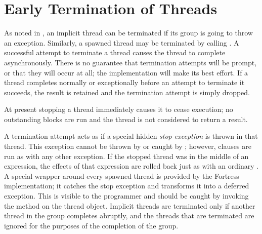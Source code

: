 %
%
%
%

\section{Early Termination of Threads}

As noted in , an implicit thread
can be terminated if its group is going to throw an exception.
Similarly, a spawned thread  may be terminated by calling
.  A successful attempt to terminate a thread causes the
thread to complete asynchronously.  There is no guarantee that
termination attempts will be prompt, or that they will occur at all;
the implementation will make its best effort.  If a thread completes
normally or exceptionally before an attempt to terminate it succeeds,
the result is retained and the termination attempt is simply dropped.

At present stopping a thread immediately causes it to cease execution;
no outstanding  blocks are run and the thread is not
considered to return a result.


A termination attempt acts as if a special hidden \emph{stop
  exception} is thrown in that thread.  This exception cannot be
thrown by  or caught by ; however, 
clauses are run as with any other exception.  If the stopped thread
was in the middle of an  expression, the effects of that
expression are rolled back just as with an ordinary .  A
special wrapper around every spawned thread is provided by the
Fortress implementation; it catches the stop exception and transforms
it into a deferred  exception.  This is visible to the
programmer and should be caught by invoking the  method on
the thread object.  Implicit threads are terminated only if another
thread in the group completes abruptly, and the threads that are
terminated are ignored for the purposes of the completion of the
group.

